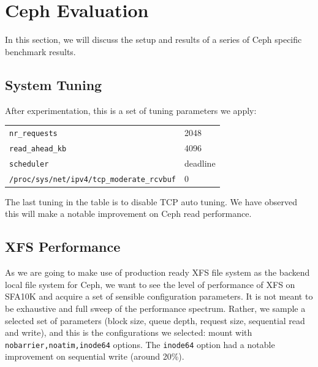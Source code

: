 \documentclass{article}
\begin{document}
\section{Ceph Evaluation}

In this section, we will discuss the setup and results of a series of Ceph
specific benchmark results.

\subsection{System Tuning}

After experimentation, this is a set of tuning parameters we apply:


\begin{table}[htb]
\centering
\begin{tabular}{ll}
    \toprule
    \verb!nr_requests! & 2048 \\
    \verb!read_ahead_kb! & 4096 \\
    \verb!scheduler! & deadline \\
    \verb!/proc/sys/net/ipv4/tcp_moderate_rcvbuf! & 0 \\
    \bottomrule
\end{tabular}

\end{table}

The last tuning in the table is to disable TCP auto tuning. We have observed
this will make a notable improvement on Ceph read performance. 


\subsection{XFS Performance}

As we are going to make use of production ready XFS file system as the backend
local file system for Ceph, we want to see the level of performance of XFS on
SFA10K and acquire a set of sensible configuration parameters.
It is not meant to be exhaustive and full sweep of the performance
spectrum. Rather, we sample a selected set of parameters (block size, queue
depth, request size, sequential read and write), and this is the configurations
we selected: mount with \verb!nobarrier,noatim,inode64! options. The
\verb!inode64! option had a notable improvement on sequential write (around
20\%).
\end{document}

